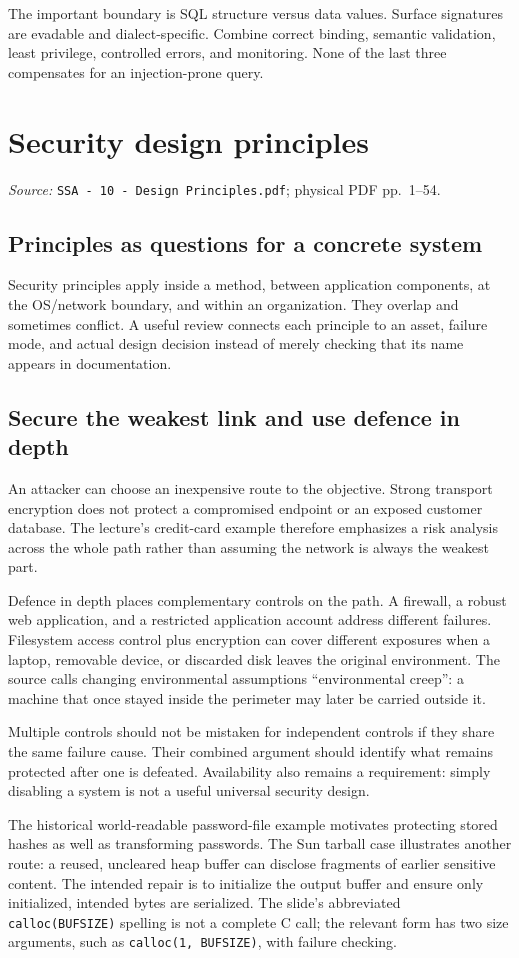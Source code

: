 \documentclass[11pt,a4paper]{article}
\newcommand{\currentmodule}{Contents}
\newcommand{\source}[2]{\textcolor{muted}{\small\textit{Source:} \nolinkurl{#1}; physical PDF pp.~#2.}\par\medskip}
\newcommand{\module}[2]{\par\Needspace{8\baselineskip}\gdef\currentmodule{#1}\section{#1}\label{#2}}
\numberwithin{figure}{section}
\begin{document}
\begin{takeaway}
The important boundary is SQL structure versus data values. Surface signatures are evadable and dialect-specific. Combine correct binding, semantic validation, least privilege, controlled errors, and monitoring. None of the last three compensates for an injection-prone query.
\end{takeaway}

\module{Security design principles}{sec:principles}
\source{SSA - 10 - Design Principles.pdf}{1--54}
\subsection{Principles as questions for a concrete system}
Security principles apply inside a method, between application components, at the OS/network boundary, and within an organization. They overlap and sometimes conflict. A useful review connects each principle to an asset, failure mode, and actual design decision instead of merely checking that its name appears in documentation.

\subsection{Secure the weakest link and use defence in depth}
An attacker can choose an inexpensive route to the objective. Strong transport encryption does not protect a compromised endpoint or an exposed customer database. The lecture's credit-card example therefore emphasizes a risk analysis across the whole path rather than assuming the network is always the weakest part.

Defence in depth places complementary controls on the path. A firewall, a robust web application, and a restricted application account address different failures. Filesystem access control plus encryption can cover different exposures when a laptop, removable device, or discarded disk leaves the original environment. The source calls changing environmental assumptions ``environmental creep'': a machine that once stayed inside the perimeter may later be carried outside it.

Multiple controls should not be mistaken for independent controls if they share the same failure cause. Their combined argument should identify what remains protected after one is defeated. Availability also remains a requirement: simply disabling a system is not a useful universal security design.

The historical world-readable password-file example motivates protecting stored hashes as well as transforming passwords. The Sun tarball case illustrates another route: a reused, uncleared heap buffer can disclose fragments of earlier sensitive content. The intended repair is to initialize the output buffer and ensure only initialized, intended bytes are serialized. The slide's abbreviated \texttt{calloc(BUFSIZE)} spelling is not a complete C call; the relevant form has two size arguments, such as \texttt{calloc(1, BUFSIZE)}, with failure checking.
\end{document}
